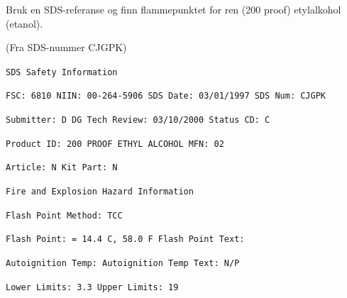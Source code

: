 

Bruk en SDS-referanse og finn flammepunktet for ren (200 proof) etylalkohol (etanol).

\vskip 10pt







(Fra SDS-nummer CJGPK)

\vskip 10pt


{\tt SDS Safety Information}

{\tt FSC: 6810 NIIN: 00-264-5906 SDS Date: 03/01/1997 SDS Num: CJGPK}

{\tt Submitter: D DG Tech Review: 03/10/2000 Status CD: C}

{\tt Product ID: 200 PROOF ETHYL ALCOHOL MFN: 02}

{\tt Article: N Kit Part: N}

\vskip 10pt

{\tt Fire and Explosion Hazard Information}

{\tt Flash Point Method: TCC}

{\tt Flash Point: = 14.4 C, 58.0 F Flash Point Text:}

{\tt Autoignition Temp: Autoignition Temp Text: N/P}

{\tt Lower Limits: 3.3 Upper Limits: 19}










